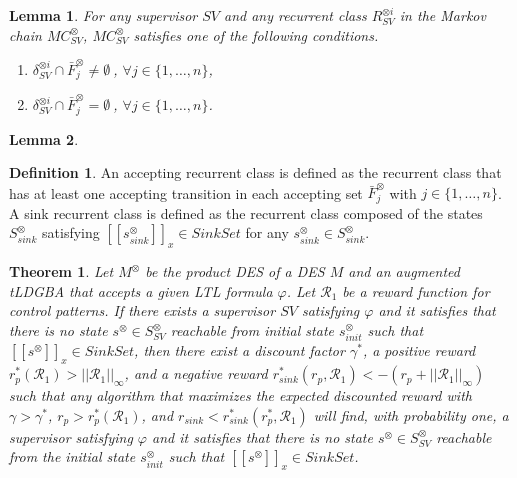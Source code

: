 \documentclass[10pt]{article}
\newtheorem{theorem}{Theorem}
\newtheorem{lemma}{Lemma}
\theoremstyle{definition}
\newtheorem{definition}{Definition}
\newcommand{\myspq}{\ensuremath{[\![s^{\otimes}]\!]}_x}
\newcommand{\myspqsink}{\ensuremath{[\![s^{\otimes}_{sink}]\!]}_x}
\begin{document}
\begin{lemma}
  For any supervisor $SV$ and any recurrent class $R^{\otimes i}_{SV}$ in the Markov chain $MC^{\otimes}_{SV}$,
  $MC^{\otimes}_{SV}$ satisfies one of the following conditions.
  \vspace{2mm}
  \begin{enumerate}
    \item $\delta^{\otimes i}_{SV} \cap \bar{F}^{\otimes}_j \neq \emptyset\ $, $ \forall j \in \{ 1, \ldots ,n \}$,
    \item $\delta^{\otimes i}_{SV} \cap \bar{F}^{\otimes}_j = \emptyset\ $, $ \forall j \in \{ 1, \ldots ,n \}$.
  \end{enumerate}
  \label{lemma3-1}
\end{lemma}

\begin{lemma}

\end{lemma}

\begin{definition}
  An accepting recurrent class is defined as the recurrent class that has at least one accepting transition in each accepting set $\bar{F}^{\otimes}_j$ with $j \in \{ 1, \ldots, n \}$. A sink recurrent class is defined as the recurrent class composed of the states $S^{\otimes}_{sink}$ satisfying $\myspqsink \in SinkSet$ for any $s^{\otimes}_{sink} \in S^{\otimes}_{sink}$.
\end{definition}

\begin{theorem}
  Let $M^{\otimes}$ be the product DES of a DES $M$ and an augmented tLDGBA that accepts a given LTL formula $\varphi$. Let $\mathcal{R}_1$ be a reward function for control patterns.
  If there exists a supervisor $SV$ satisfying $\varphi$ and it satisfies that there is no state $s^{\otimes} \in S^{\otimes}_{SV}$ reachable from initial state $s^{\otimes}_{init}$ such that $\myspq \in SinkSet$, then there exist a discount factor $\gamma^{\ast}$, a positive reward $r^{\ast}_p(\mathcal{R}_1) > ||\mathcal{R}_1||_{\infty}$, and a negative reward $r^{\ast}_{sink}(r_p, \mathcal{R}_1) < - (r_p + ||\mathcal{R}_1||_{\infty}) $ such that any algorithm that maximizes the expected discounted reward with $\gamma > \gamma^{\ast}$, $r_p > r^{\ast}_p(\mathcal{R}_1)$, and $r_{sink} < r^{\ast}_{sink}(r^{\ast}_p, \mathcal{R}_1)$ will find, with probability one, a supervisor satisfying $\varphi$ and it satisfies that there is no state $s^{\otimes} \in S^{\otimes}_{SV}$ reachable from the initial state $s^{\otimes}_{init}$ such that $\myspq \in SinkSet$.
\end{theorem}
\end{document}
